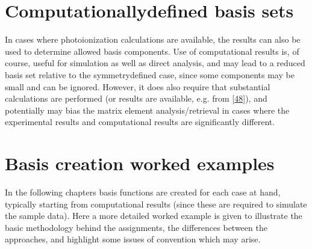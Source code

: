 \documentclass[letterpaper,table,10pt,english]{jupyterBook}
\begin{document}
\section{Computationally\sphinxhyphen{}defined basis sets}
\label{\detokenize{part2/sym-fitting-intro_240723:computationally-defined-basis-sets}}
\sphinxAtStartPar
In cases where photoionization calculations are available, the results can also be used to determine allowed basis components. Use of  computational results is, of course, useful for simulation as well as direct analysis, and may lead to a reduced basis set relative to the symmetry\sphinxhyphen{}defined case, since some components may be small and can be ignored. However, it does also require that substantial calculations are performed (or results are available, e.g. from  {[}\hyperlink{cite.backmatter/bibliography:id678}{48}{]}), and \sphinxhyphen{} potentially \sphinxhyphen{} may bias the matrix element analysis/retrieval in cases where the experimental results and computational results are significantly different.


\section{Basis creation worked examples}
\label{\detokenize{part2/sym-fitting-intro_240723:basis-creation-worked-examples}}
\sphinxAtStartPar
In the following chapters basis functions are created for each case at hand, typically starting from  computational results (since these are required to simulate the sample data). Here a more detailed worked example is given to illustrate the basic methodology behind the assignments, the differences between the approaches, and highlight some issues of convention which may arise.
\end{document}
